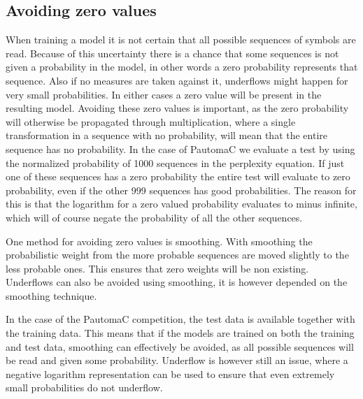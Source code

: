 \subsection{Avoiding zero values}

When training a model it is not certain that all possible sequences of symbols are read. Because of this uncertainty there is a chance that some sequences is not given a probability in the model, in other words a zero probability represents that sequence. Also if no measures are taken against it, underflows might happen for very small probabilities. In either cases a zero value will be present in the resulting model. Avoiding these zero values is important, as the zero probability will otherwise be propagated through multiplication, where a single transformation in a sequence with no probability, will mean that the entire sequence has no probability. In the case of PautomaC we evaluate a test by using the normalized probability of 1000 sequences in the perplexity equation. If just one of these sequences has a zero probability the entire test will evaluate to zero probability, even if the other 999 sequences has good probabilities. The reason for this is that the logarithm for a zero valued probability evaluates to minus infinite, which will of course negate the probability of all the other sequences.


One method for avoiding zero values is smoothing. With smoothing the probabilistic weight from the more probable sequences are moved slightly to the less probable ones. This ensures that zero weights will be non existing. Underflows can also be avoided using smoothing, it is however depended on the smoothing technique.


In the case of the PautomaC competition, the test data is available together with the training data. This means that if the models are trained on both the training and test data, smoothing can effectively be avoided, as all possible sequences will be read and given some probability. Underflow is however still an issue, where a negative logarithm representation can be used to ensure that even extremely small probabilities do not underflow.